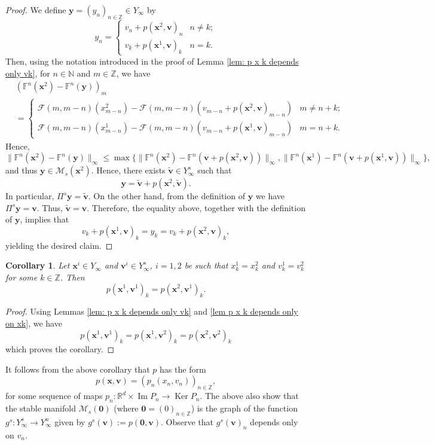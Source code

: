 \documentclass[reqno, a4paper, 10pt]{amsart}
\theoremstyle{plain}
\numberwithin{equation}{section}
\newtheorem{corollary}{Corollary}
\theoremstyle{remark}
\DeclareMathOperator{\Ima}{Im}
\DeclareMathOperator{\Ker}{Ker}
\begin{document}
\begin{proof}
We define $\mathbf y=(y_n)_{n\in \mathbb Z}\in Y_\infty$ by 
\[
y_n=\begin{cases}
v_n +p(\mathbf x^2, \mathbf v)_n &n\neq k; \\
v_k+p(\mathbf x^1, \mathbf v)_k & n=k.
\end{cases}
\]
Then, using the notation introduced in the proof of Lemma \ref{lem: p x k depends only vk}, for $n \in \mathbb N$ and $m\in \mathbb Z$, we have 
\[
\begin{split}
&(\mathbb F^n (\mathbf x^2)-\mathbb F^n(\mathbf y))_m \\
&=\begin{cases}
\mathcal F(m, m-n)(x_{m-n}^2)-\mathcal F(m, m-n)(v_{m-n}+p(\mathbf x^2, \mathbf v)_{m-n})& m\neq n+k; \\
\mathcal F(m, m-n)(x_{m-n}^1)-\mathcal F(m, m-n)(v_{m-n}+p(\mathbf x^1, \mathbf v)_{m-n}) & m=n+k.
\end{cases}
\end{split}
\]
Hence, 
\[
\|\mathbb F^n (\mathbf x^2)-\mathbb F^n(\mathbf y)\|_\infty \le \max \{\|\mathbb F^n(\mathbf x^2)-\mathbb F^n(\mathbf v+p(\mathbf x^2, \mathbf v))\|_\infty, \|\mathbb F^n(\mathbf x^1)-\mathbb F^n(\mathbf v+p(\mathbf x^1, \mathbf v))\|_\infty\},
\]
and thus $\mathbf y\in \mathcal M_s(\mathbf x^2)$. Hence, there exists $\tilde{\mathbf v}\in Y_\infty^s$ such that
\[
\mathbf y=\tilde{\mathbf v}+p(\mathbf x^2, \tilde{\mathbf v}).
\]
In particular, $\Pi^s\mathbf y=\tilde{\mathbf v}$. On the other hand, from the definition of $\mathbf y$ we have $\Pi^s\mathbf y=\mathbf v$. Thus, $\tilde{\mathbf v}=\mathbf v$. Therefore, the equality above, together with the definition of $\mathbf y$, implies that
\[
v_k+p(\mathbf x^1, \mathbf v)_k =y_k=v_k+p(\mathbf x^2, \mathbf v)_k,
\]
yielding the desired claim.
\end{proof}


\begin{corollary}
Let $\mathbf x^i\in Y_\infty$ and $\mathbf v^i\in Y_\infty^s$, $i=1, 2$ be such that $x_k^1=x_k^2$ and $v_k^1=v_k^2$ for some $k\in \mathbb Z$. Then
\[
p(\mathbf x^1, \mathbf v^1)_k=p(\mathbf x^2, \mathbf v^1)_k.
\]
\end{corollary}

\begin{proof}
Using Lemmas \ref{lem: p x k depends only vk} and \ref{lem p x k depends only on xk}, we have 
\[
p(\mathbf x^1, \mathbf v^1)_k=p(\mathbf x^1, \mathbf v^2)_k=p(\mathbf x^2, \mathbf v^2)_k
\]
which proves the corollary.
\end{proof}
It follows from the above corollary that $p$ has the form
\[
p(\mathbf x, \mathbf v)=(p_n(x_n, v_n))_{n\in \mathbb Z},
\]
for some sequence of maps $p_n\colon \mathbb R^d \times \Ima P_n \to \Ker P_n$. The above also show that the stable manifold $\mathcal M_s(\mathbf 0)$ (where $\mathbf 0=(0)_{n\in \mathbb Z}$) is the graph of the function $g^s \colon Y_\infty^s \to Y_\infty^u$ given by $g^s(\mathbf v):=p(\mathbf 0, \mathbf v)$. Observe that $g^s(\mathbf v)_n$ depends only on $v_n$.
\end{document}
